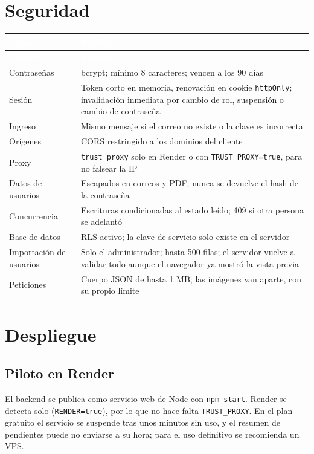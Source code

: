 \documentclass[11pt,letterpaper]{article}
\newcommand{\cabecera}{\rowcolor{maxamPrimario}}
\newcommand{\tth}[1]{\textcolor{white}{\textbf{#1}}}
\newcommand{\code}[1]{\nolinkurl{#1}}
\begin{document}
\section{Seguridad}
\begin{xltabular}{\textwidth}{L{4.2cm} Y}
\cabecera \tth{Aspecto} & \tth{Medida} \\
\endfirsthead
\cabecera \tth{Aspecto} & \tth{Medida} \\
\endhead
{} Contraseñas & bcrypt; mínimo 8 caracteres; vencen a los 90 días \\
Sesión & Token corto en memoria, renovación en cookie \code{httpOnly}; invalidación inmediata por cambio de rol, suspensión o cambio de contraseña \\
 Ingreso & Mismo mensaje si el correo no existe o la clave es incorrecta \\
Orígenes & CORS restringido a los dominios del cliente \\
 Proxy & \code{trust proxy} solo en Render o con \code{TRUST_PROXY=true}, para no falsear la IP \\
Datos de usuarios & Escapados en correos y PDF; nunca se devuelve el hash de la contraseña \\
 Concurrencia & Escrituras condicionadas al estado leído; 409 si otra persona se adelantó \\
Base de datos & RLS activo; la clave de servicio solo existe en el servidor \\
 Importación de usuarios & Solo el administrador; hasta 500 filas; el servidor vuelve a validar todo aunque el navegador ya mostró la vista previa \\
Peticiones & Cuerpo JSON de hasta 1 MB; las imágenes van aparte, con su propio límite \\
\end{xltabular}

\section{Despliegue}

\subsection{Piloto en Render}
El backend se publica como servicio web de Node con \code{npm start}. Render se detecta solo (\code{RENDER=true}), por lo que no hace falta \code{TRUST_PROXY}. En el plan gratuito el servicio se suspende tras unos minutos sin uso, y el resumen de pendientes puede no enviarse a su hora; para el uso definitivo se recomienda un VPS.
\end{document}
